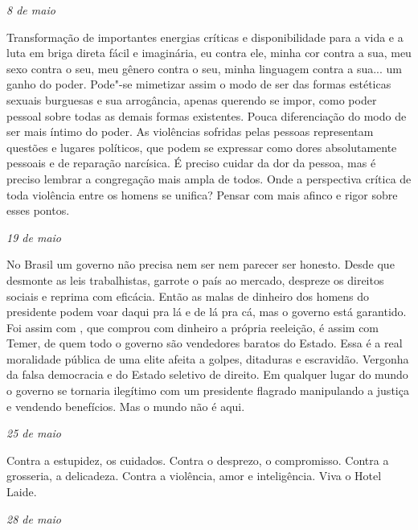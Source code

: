 \begin{flushright}
\emph{8 de maio}
\end{flushright}

Transformação de importantes energias críticas e disponibilidade para a
vida e a luta em briga direta fácil e imaginária, eu contra ele, minha
cor contra a sua, meu sexo contra o seu, meu gênero contra o seu, minha
linguagem contra a sua... um ganho do poder. Pode"-se mimetizar assim o
modo de ser das formas estéticas sexuais burguesas e sua arrogância,
apenas querendo se impor, como poder pessoal sobre todas as demais
formas existentes. Pouca diferenciação do modo de ser mais íntimo do
poder. As violências sofridas pelas pessoas representam questões e
lugares políticos, que podem se expressar como dores absolutamente
pessoais e de reparação narcísica. É preciso cuidar da dor da pessoa,
mas é preciso lembrar a congregação mais ampla de todos. Onde a
perspectiva crítica de toda violência entre os homens se unifica? Pensar
com mais afinco e rigor sobre esses pontos.

\begin{flushright}
\emph{19 de maio}
\end{flushright}

No Brasil um governo não precisa nem ser nem parecer ser honesto. Desde
que desmonte as leis trabalhistas, garrote o país ao mercado, despreze
os direitos sociais e reprima com eficácia. Então as malas de dinheiro
dos homens do presidente podem voar daqui pra lá e de lá pra cá, mas o
governo está garantido. Foi assim com , que comprou com dinheiro a
própria reeleição, é assim com Temer, de quem todo o governo são
vendedores baratos do Estado. Essa é a real moralidade pública de uma
elite afeita a golpes, ditaduras e escravidão. Vergonha da falsa
democracia e do Estado seletivo de direito. Em qualquer lugar do mundo o
governo se tornaria ilegítimo com um presidente flagrado manipulando a
justiça e vendendo benefícios. Mas o mundo não é aqui.

\begin{flushright}
\emph{25 de maio}
\end{flushright}

Contra a estupidez, os cuidados. Contra o desprezo, o compromisso.
Contra a grosseria, a delicadeza. Contra a violência, amor e
inteligência. Viva o Hotel Laide.

\begin{flushright}
\emph{28 de maio}
\end{flushright}

